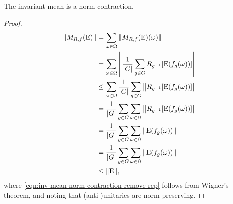 \begin{lem}\label{lem:inv-mean-contraction}
  The invariant mean is a norm contraction.
  \begin{proof}
    \begin{align}
      {\left\lVert{M_{R,f}(\operatorname{E})}\right\rVert} &= \sum_{\omega\in\Omega} {\left\lVert{M_{R,f}(\operatorname{E})(\omega)}\right\rVert}\\
                           &= \sum_{\omega\in\Omega} {\left\lVert{\frac{1}{{\left\lvert{G}\right\rvert}}\sum_{g\in G} R_{g^{-1}}\! \left[\operatorname{E}(f_g(\omega))\right]}\right\rVert}\\
                           &\leq \sum_{\omega\in\Omega} \frac{1}{{\left\lvert{G}\right\rvert}}\sum_{g\in G} {\left\lVert{ R_{g^{-1}}\! \left[\operatorname{E}(f_g(\omega))\right]}\right\rVert}\\
                           &=\frac{1}{{\left\lvert{G}\right\rvert}}\sum_{g\in G} \sum_{\omega\in\Omega}  {\left\lVert{ R_{g^{-1}}\! \left[\operatorname{E}(f_g(\omega))\right]}\right\rVert}\\
                           &=\frac{1}{{\left\lvert{G}\right\rvert}}\sum_{g\in G} \sum_{\omega\in\Omega}  {\left\lVert{ \operatorname{E}(f_g(\omega))}\right\rVert} \label{eqn:inv-mean-norm-contraction-remove-rep} \\ 
                           &=\frac{1}{{\left\lvert{G}\right\rvert}}\sum_{g\in G} \sum_{\omega\in\Omega}  {\left\lVert{ \operatorname{E}(f_g(\omega))}\right\rVert}\\
                           &\leq {\left\lVert{\operatorname{E}}\right\rVert},
    \end{align}
    where \ref{eqn:inv-mean-norm-contraction-remove-rep} follows from Wigner's theorem, and noting that (anti-)unitaries are norm preserving.
  \end{proof}
\end{lem}

